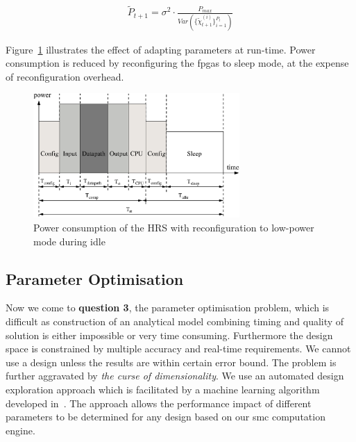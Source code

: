 \begin{equation}
\begin{aligned}
\widetilde{P}_{t+1} = \sigma^2 \cdot \frac{P_{max}}{Var(\{\widetilde{\chi}_{t+1}^{(i)}\}^{P_t}_{i=1})}
\end{aligned}
\label{eqt:bound2b}
\end{equation}

Figure~\ref{fig:timing2b} illustrates the effect of adapting parameters at run-time.
Power consumption is reduced by reconfiguring the \glspl{fpga} to sleep mode, at the expense of reconfiguration overhead.

\begin{figure}[t!]
\begin{center}
\includegraphics[width=0.7\textwidth]{4_adaptation/figures/fig_timing2}
\end{center}
\caption{Power consumption of the HRS with reconfiguration to low-power mode during idle}
\label{fig:timing2b}
\end{figure}

\subsection{Parameter Optimisation}
\label{sec:flow_dse}

Now we come to \textbf{question 3}, the parameter optimisation problem, which is difficult as construction of an analytical model combining timing and quality of solution is either impossible or very time consuming. 
Furthermore the design space is constrained by multiple accuracy and real-time requirements.
We cannot use a design unless the results are within certain error bound.
The problem is further aggravated by \textit{the curse of dimensionality}.
We use an automated design exploration approach which is facilitated by a machine learning algorithm developed in~\cite{kurek14fccm}.
The approach allows the performance impact of different parameters to be determined for any design based on our \gls{smc} computation engine. 

